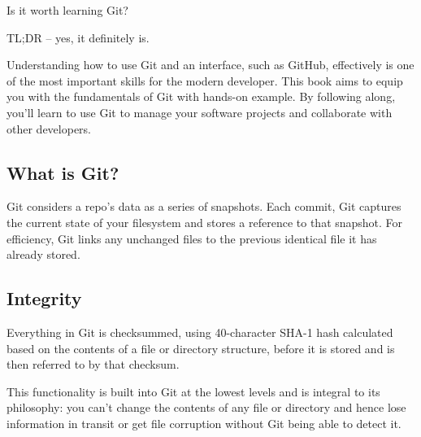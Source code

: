 \noindent Is it worth learning Git? \newline

\noindent TL;DR – yes, it definitely is. \newline

Understanding how to use Git and an interface, such as GitHub, effectively is one of the most important skills for the modern developer. This book aims to equip you with the fundamentals of Git with hands-on example. By following along, you'll learn to use Git to manage your software projects and collaborate with other developers.



\subsection{What is Git?}

Git considers a repo's data as a series of snapshots. Each commit, Git captures the current state of your filesystem and stores a reference to that snapshot. For efficiency, Git links any unchanged files to the previous identical file it has already stored.



\subsection{Integrity}

Everything in Git is checksummed, using 40-character SHA-1 hash calculated based on the contents of a file or directory structure, before it is stored and is then referred to by that checksum.

\begin{center}
\end{center}

This functionality is built into Git at the lowest levels and is integral to its philosophy: you can't change the contents of any file or directory and hence lose information in transit or get file corruption without Git being able to detect it.

